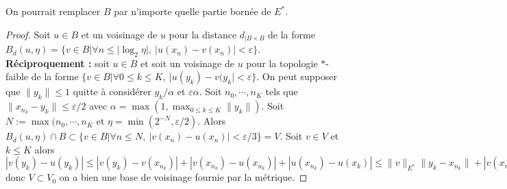 \begin{remarque}
    On pourrait remplacer $B$ par n'importe quelle partie bornée de $E^*$.
\end{remarque}

\begin{proof}
    Soit $u\in B$ et un voisinage de $u$ pour la distance $d_{|B\times B}$ de la forme $B_d(u, \eta)=\{v\in B| \forall n\le |\log_2\eta|,\ |u(x_{n})-v(x_{n})|<\varepsilon\} $.\\
    \textbf{Réciproquement :} soit $u\in B$ et soit un voisinage de $u$ pour la topologie $*$-faible de la forme $\{v\in B|\forall 0\le k\le K,\ |u(y_{k})-v(y_{k}|<\varepsilon  \} $. On peut supposer que $\|y_k\|\le 1$ quitte à considérer $y_k/\alpha $ et $\varepsilon \alpha $. Soit $n_0, \cdots, n_K$ tels que $\|x_{n_k}-y_k \|\le \varepsilon /2$ avec $\alpha =\max(1, \max_{0\le k\le K}\|y_k\|)$. Soit $N:=\max(n_0,\cdots,n_K$ et $\eta=\min(2^{-N},\varepsilon /2)$. Alors $B_d(u, \eta)\cap B\subset \{v\in B| \forall n\le N,\ |v(x_{n})-u(x_{n})|<\varepsilon /3 \} =V$. Soit $v\in V$ et $k\le K$ alors $|v(y_k)-u(y_k)|\le |v(y_k)-v(x_{n_k})|+|v(x_{n_k})-u(x_{n_k})|+|u(x_{n_k})-u(x_k)|\le \|v\|_{E^*}\|y_k-x_{n_k}\|+|v(x_{n_k})-u(x_{n_k})|+\|u\|_{E^*}\|y_k-x_{n_k}\|\le 1*\varepsilon /3+\varepsilon /3 +1*\varepsilon /3<\varepsilon $ donc $V\subset V_0$ on a bien une base de voisinage fournie par la métrique.
\end{proof}
